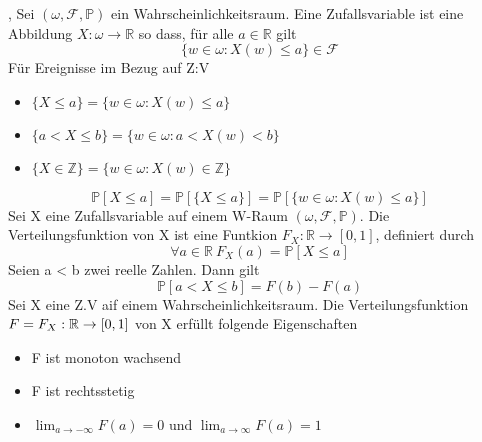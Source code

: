 \sep
\Def[2.1 Zufallsvariable] \newline
Sei \( (\omega, \mathcal{F}, \mathbb{P})\) ein Wahrscheinlichkeitsraum. Eine Zufallsvariable ist eine Abbildung \( X : \omega \rightarrow \mathbb{R} \) so dass, für alle \( a \in \mathbb{R}\) gilt \[ \{ w \in \omega : X(w) \leq a \} \in \mathcal{F}\]
\Bem  \newline
Für Ereignisse im Bezug auf Z:V
\begin{itemize}
    \item \( \{X \leq a \} = \{ w \in \omega : X(w) \leq a\}\)
    \item \( \{ a < X \leq b \} = \{ w \in \omega : a < X(w) < b\}\)
    \item \( \{ X \in \mathbb{Z}\} = \{ w \in \omega : X(w) \in \mathbb{Z}\}\)
\end{itemize}
\[ \mathbb{P}[X \leq a] = \mathbb{P}[\{X \leq a\}] = \mathbb{P}[\{w \in \omega : X(w) \leq a\}]\]
\Def[2.2 Verteilungsfunktion] \newline
Sei X eine Zufallsvariable auf einem W-Raum \( (\omega, \mathcal{F}, \mathbb{P})\). Die Verteilungsfunktion von X ist eine Funtkion \(F_X : \mathbb{R} \rightarrow [0,1]\), definiert durch \[ \forall a \in \mathbb{R} \ F_X(a) = \mathbb{P}[X \leq a]\]
 \newline
Seien a < b zwei reelle Zahlen. Dann gilt \[ \mathbb{P}[a < X \leq b ] = F(b) - F(a)\]
 \newline
Sei X eine Z.V aif einem Wahrscheinlichkeitsraum. Die Verteilungsfunktion \( F = F_X : \mathbb{R} \rightarrow [0,1]\) von X erfüllt folgende Eigenschaften
\begin{itemize}
    \item F ist monoton wachsend
    \item F ist rechtsstetig
    \item \( \lim_{a \rightarrow -\infty} F(a) = 0 \) und \( \lim_{a \rightarrow \infty} F(a) = 1\)
\end{itemize}